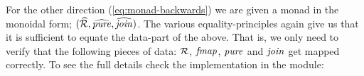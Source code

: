 %
For the other direction (\ref{eq:monad-backwards}) we are given a
monad in the monoidal form; $(\EndoR, \pureNT, \joinNT)$.  The various
equality-principles again give us that it is sufficient to equate the
data-part of the above.  That is, we only need to verify that the
following pieces of data: $\mathcal{R}$, $\fmap$, $\pure$ and $\join$ get
mapped correctly.  To see the full details check the implementation in
the module:
%
\begin{center}
\end{center}
